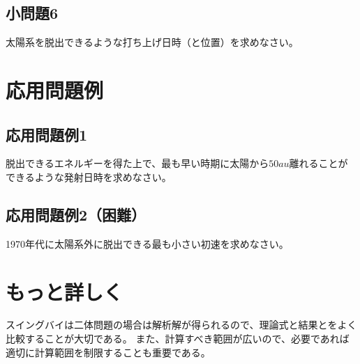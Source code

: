 \documentclass{article}
\begin{document}
\subsection{ 小問題6 }

太陽系を脱出できるような打ち上げ日時（と位置）を求めなさい。

\section{ 応用問題例 }

\subsection{ 応用問題例1 }

脱出できるエネルギーを得た上で、最も早い時期に太陽から$50au$離れることができるような発射日時を求めなさい。

\subsection{ 応用問題例2（困難） }

1970年代に太陽系外に脱出できる最も小さい初速を求めなさい。

\section{ もっと詳しく }

スイングバイは二体問題の場合は解析解が得られるので、理論式と結果とをよく比較することが大切である。
また、計算すべき範囲が広いので、必要であれば適切に計算範囲を制限することも重要である。
\end{document}
